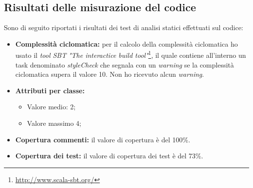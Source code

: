 \subsection*{Risultati delle misurazione del codice}
Sono di seguito riportati i risultati dei test di analisi statici effettuati sul codice:
\begin{itemize}
	\item \textbf{Complessità ciclomatica: }per il calcolo della complessità ciclomatica ho usato il \textit{tool SBT} \textit{"The interactice build tool"}\footnote{\url{http://www.scala-sbt.org/}}, il quale contiene all'interno un task denominato \textit{styleCheck} che segnala con un \textit{warning} se la complessità ciclomatica supera il valore 10. Non ho ricevuto alcun \textit{warning}.
	\item \textbf{Attributi per classe:}
	\begin{itemize}
		\item Valore medio: 2;
		\item Valore massimo 4;
	\end{itemize}
	\item \textbf{Copertura commenti:} il valore di copertura è del 100\%.
	\item \textbf{Copertura dei test:} il valore di copertura dei test è del 73\%.
\end{itemize}




